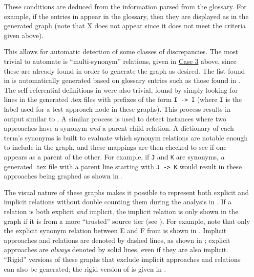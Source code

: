     \begin{minipage}{0.35\textwidth}
        These conditions are deduced from the information parsed
        from the glossary. For example, if the entries in 
        appear in the glossary, then they are displayed as 
        in the generated graph (note that X does not appear since it does not
        meet the criteria given above).
    \end{minipage} \newpage

    This allows for automatic detection of some classes of discrepancies. The
    most trivial to automate is ``multi-synonym'' relations, given in
    \hyperref[case-three]{Case 3} above, since these are already found in order
    to generate the graph as desired. The list found in 
    is automatically generated based on glossary entries such as those found
    in . The self-referential definitions in
     were also trivial, found by simply looking for lines in
    the generated .tex files with prefixes of the form \texttt{I -> I} (where
    \texttt{I} is the label used for a test approach node in these graphs).
    This process results in output similar to . A
    similar process is used to detect instances where two approaches have a
    synonym \emph{and} a parent-child relation. A dictionary of each term's
    synonyms is built to evaluate which synonym relations are notable
    enough to include in the graph, and these mappings are then checked to
    see if one appears as a parent of the other. For example, if \texttt{J}
    and \texttt{K} are synonyms, a generated .tex file with a parent line
    starting with \texttt{J -> K} would result in these approaches being
    graphed as shown in .

    The visual nature of these graphs makes it possible to represent both
    explicit and implicit relations without double counting them during the
    analysis in . If a relation is both explicit
    \emph{and} implicit, the implicit relation is only shown in the graph
    if it is from a more ``trusted'' source tier (see ).
    For example, note that only the explicit synonym relation between E and F
    from  is shown in .
    Implicit approaches and relations are denoted by dashed lines, as shown
    in ; explicit approaches are
    \emph{always} denoted by solid lines, even if they are also implicit.
    ``Rigid'' versions of these graphs that exclude implicit approaches and
    relations can also be generated; the rigid version of
     is given in .

